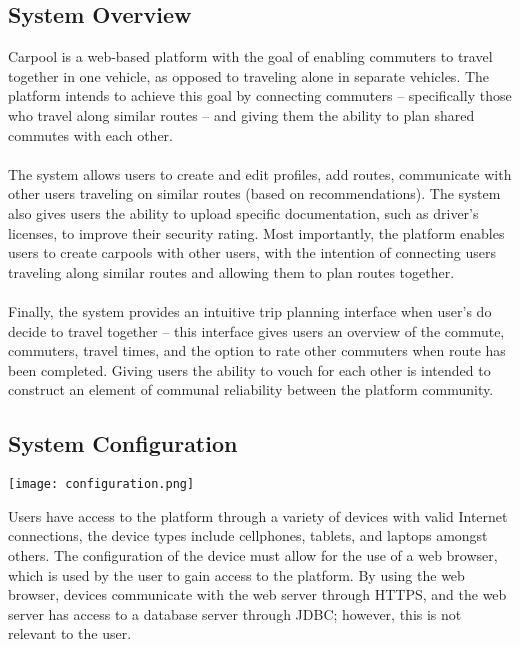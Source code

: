 \documentclass[12pt]{article}
\begin{document}
\subsection{System Overview}
Carpool is a web-based platform with the goal of enabling commuters to travel together in one vehicle, as opposed to traveling alone in separate vehicles. The platform intends to achieve this goal by
connecting commuters – specifically those who travel along similar routes – and giving them the ability to plan shared commutes with each other.
\\
\\
The system allows users to create and edit profiles, add routes, communicate with other users traveling
on similar routes (based on recommendations). The system also gives users the ability to upload specific
documentation, such as driver’s licenses, to improve their security rating. Most importantly, the
platform enables users to create carpools with other users, with the intention of connecting users
traveling along similar routes and allowing them to plan routes together.
\\
\\
Finally, the system provides an intuitive trip planning interface when user’s do decide to travel together
– this interface gives users an overview of the commute, commuters, travel times, and the option to rate
other commuters when route has been completed. Giving users the ability to vouch for each other is
intended to construct an element of communal reliability between the platform community.

\subsection{System Configuration}
\begin{center}
\texttt{[image: configuration.png]}
\end{center}
Users have access to the platform through a variety of devices with valid Internet connections, the device types include cellphones, tablets, and laptops amongst others. The configuration of the device
must allow for the use of a web browser, which is used by the user to gain access to the platform. By using the web browser, devices communicate with the web server through HTTPS, and the web server
has access to a database server through JDBC; however, this is not relevant to the user.
\end{document}
